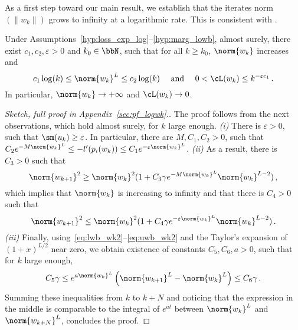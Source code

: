 
As a first step toward our main result, we establish that the iterates norm $(\lVert w_k\rVert)$ grows to infinity at a logarithmic rate. This is consistent with \cite[Theorem 4.3]{Lyu_Li_maxmargin}.
\begin{proposition}\label{prop:log_wk}
  Under Assumptions~\ref{hyp:loss_exp_log}--\ref{hyp:marg_lowb}, almost surely, there exist $c_1, c_2, \varepsilon>0$ and $k_0 \in \bbN$, such that for all $k \geq k_0$, $\norm{w_k}$ increases and
  \begin{equation*}
    c_1 \log (k)\leq \norm{w_k}^L \leq c_2 \log(k) \quad \textrm{ and } \quad 0 < \cL(w_k) \leq k^{-\varepsilon c_1}\, .
  \end{equation*}
  In particular, $\norm{w_k}\rightarrow + \infty$ and $\cL(w_k) \rightarrow 0$.
\end{proposition}
\begin{proof}[Sketch, full proof in Appendix~\ref{sec:pf_logwk}.] The proof follows from the next observations, which hold almost surely, for $k$ large enough. \emph{(i)} There is $\varepsilon >0$, such that $\sm(u_k) \geq \varepsilon$. In particular, there are $M, C_1, C_2>0$, such that $ C_2 e^{-M \norm{w_k}^L}\leq -l'(p_i(w_k)) \leq C_1e^{-\varepsilon \norm{w_k}^L}$. \emph{(ii)} As a result, there is $C_3 >0$ such that
  \begin{equation}\label{eq:lwb_wk2}
    \norm{w_{k+1}}^2 \geq \norm{w_k}^2 ( 1 + C_3 \gamma e^{-M \norm{w_k}^L } \norm{w_k}^{L-2})\, ,
  \end{equation}
  which implies that $\norm{w_k}$ is increasing to infinity and that there is $C_4 >0$ such that
  \begin{equation}\label{eq:uwb_wk2}
    \norm{w_{k+1}}^2 \leq \norm{w_k}^2 (1 + C_4 \gamma e^{-\varepsilon \norm{w_k}^L}\norm{w_k}^{L-2})\, .
  \end{equation}\emph{(iii)} Finally, using~\eqref{eq:lwb_wk2}--\eqref{eq:uwb_wk2} and the Taylor's expansion of $(1+x)^{L/2}$ near zero, we obtain existence of constants $C_5, C_6, a>0$, such that for $k$ large enough,
  \begin{equation*}
    C_5 \gamma \leq e^{a \norm{w_k}^L}\left(\norm{w_{k+1}}^L - \norm{w_k}^L\right) \leq C_6 \gamma \, .
  \end{equation*}
Summing these inequalities from $k$ to $k+N$ and noticing that the expression in the middle is comparable to the integral of $e^{at}$ between $\norm{w_{k}}^L$ and $\norm{w_{k+N}}^L$, concludes the proof.
\end{proof}
